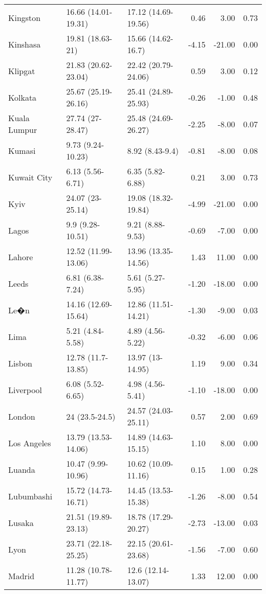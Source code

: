 \begin{longtable}{lllrrr}
  Kingston & 16.66
 (14.01-19.31) & 17.12
 (14.69-19.56) & 0.46 & 3.00 & 0.73 \\ 
  Kinshasa & 19.81
 (18.63-21) & 15.66
 (14.62-16.7) & -4.15 & -21.00 & 0.00 \\ 
  Klipgat & 21.83
 (20.62-23.04) & 22.42
 (20.79-24.06) & 0.59 & 3.00 & 0.12 \\ 
  Kolkata & 25.67
 (25.19-26.16) & 25.41
 (24.89-25.93) & -0.26 & -1.00 & 0.48 \\ 
  Kuala Lumpur & 27.74
 (27-28.47) & 25.48
 (24.69-26.27) & -2.25 & -8.00 & 0.07 \\ 
  Kumasi & 9.73
 (9.24-10.23) & 8.92
 (8.43-9.4) & -0.81 & -8.00 & 0.08 \\ 
  Kuwait City & 6.13
 (5.56-6.71) & 6.35
 (5.82-6.88) & 0.21 & 3.00 & 0.73 \\ 
  Kyiv & 24.07
 (23-25.14) & 19.08
 (18.32-19.84) & -4.99 & -21.00 & 0.00 \\ 
  Lagos & 9.9
 (9.28-10.51) & 9.21
 (8.88-9.53) & -0.69 & -7.00 & 0.00 \\ 
  Lahore & 12.52
 (11.99-13.06) & 13.96
 (13.35-14.56) & 1.43 & 11.00 & 0.00 \\ 
  Leeds & 6.81
 (6.38-7.24) & 5.61
 (5.27-5.95) & -1.20 & -18.00 & 0.00 \\ 
  Le�n & 14.16
 (12.69-15.64) & 12.86
 (11.51-14.21) & -1.30 & -9.00 & 0.03 \\ 
  Lima & 5.21
 (4.84-5.58) & 4.89
 (4.56-5.22) & -0.32 & -6.00 & 0.06 \\ 
  Lisbon & 12.78
 (11.7-13.85) & 13.97
 (13-14.95) & 1.19 & 9.00 & 0.34 \\ 
  Liverpool & 6.08
 (5.52-6.65) & 4.98
 (4.56-5.41) & -1.10 & -18.00 & 0.00 \\ 
  London & 24
 (23.5-24.5) & 24.57
 (24.03-25.11) & 0.57 & 2.00 & 0.69 \\ 
  Los Angeles & 13.79
 (13.53-14.06) & 14.89
 (14.63-15.15) & 1.10 & 8.00 & 0.00 \\ 
  Luanda & 10.47
 (9.99-10.96) & 10.62
 (10.09-11.16) & 0.15 & 1.00 & 0.28 \\ 
  Lubumbashi & 15.72
 (14.73-16.71) & 14.45
 (13.53-15.38) & -1.26 & -8.00 & 0.54 \\ 
  Lusaka & 21.51
 (19.89-23.13) & 18.78
 (17.29-20.27) & -2.73 & -13.00 & 0.03 \\ 
  Lyon & 23.71
 (22.18-25.25) & 22.15
 (20.61-23.68) & -1.56 & -7.00 & 0.60 \\ 
  Madrid & 11.28
 (10.78-11.77) & 12.6
 (12.14-13.07) & 1.33 & 12.00 & 0.00 \\ 

\end{longtable}
